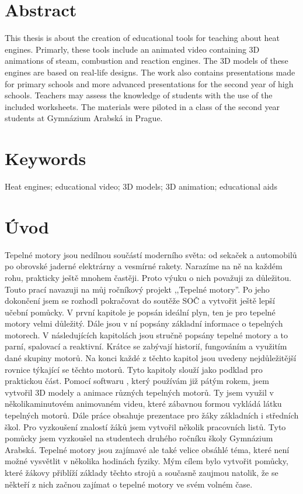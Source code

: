 \section*{Abstract}
{This thesis is about the creation of educational tools for teaching about heat engines. Primarly, these tools include an animated video containing 3D animations of steam, combustion and reaction engines. The 3D models of these engines are based on real-life designs. The work also contains presentations made for primary schools and more advanced presentations for the second year of high schools. Teachers may assess the knowledge of students with the use of the included worksheets. The materials were piloted in a class of the second year students at Gymnázium Arabská in Prague.}

\section*{Keywords}
{Heat engines; educational video; 3D models; 3D animation; educational aids}

\newpage

\tableofcontents


\newpage
\pagestyle{plain}

\section{Úvod}
{Tepelné motory jsou nedílnou součástí moderního světa: od sekaček a automobilů po obrovské jaderné elektrárny a vesmírné rakety. Narazíme na ně na každém rohu, prakticky ještě mnohem častěji. Proto výuku o nich považuji za důležitou. Touto prací navazuji na můj ročníkový projekt ,,Tepelné motory”. Po jeho dokončení jsem se rozhodl pokračovat do soutěže SOČ a vytvořit ještě lepší učební pomůcky.}\odst
{V první kapitole je popsán ideální plyn, ten je pro tepelné motory velmi důležitý. Dále jsou v ní popsány základní informace o tepelných motorech. V následujících kapitolách jsou stručně popsány tepelné motory a to parní, spalovací a reaktivní. Krátce se zabývají historií, fungováním a využitím dané skupiny motorů. Na konci každé z těchto kapitol jsou uvedeny nejdůležitější rovnice týkající se těchto motorů. Tyto kapitoly slouží jako podklad pro praktickou část.}\odst
{Pomocí softwaru , který používám již pátým rokem, jsem vytvořil 3D modely a ani\-ma\-ce různých tepelných motorů. Ty jsem využil v několikaminutovém animovaném videu, které zábavnou formou vykládá látku tepelných motorů. Dále práce obsahuje prezentace pro žáky základních i středních škol. Pro vyzkoušení znalostí žáků jsem vytvořil několik pracovních listů. Tyto pomůcky jsem vyzkoušel na studentech druhého ročníku školy Gymnázium Arabská.}\odst
{Tepelné motory jsou zajímavé ale také velice obsáhlé téma, které není možné vysvětlit v několika hodinách fyziky. Mým cílem bylo vytvořit pomůcky, které žákovy přiblíží základy těchto strojů a současně zaujmou natolik, že se někteří z nich začnou zajímat o tepelné motory ve svém volném čase.}

